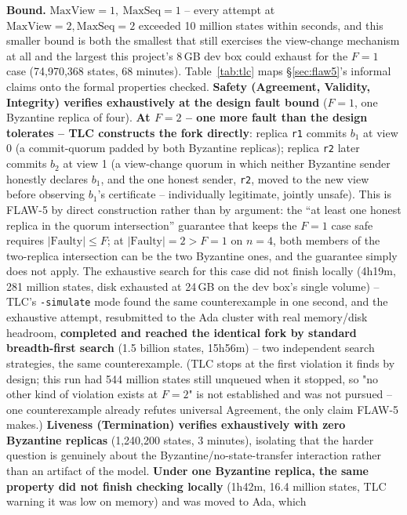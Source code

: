 \documentclass[conference]{IEEEtran}
\begin{document}
\textbf{Bound.} $\text{MaxView}{=}1,\ \text{MaxSeq}{=}1$ -- every attempt at
$\text{MaxView}{=}2,\text{MaxSeq}{=}2$ exceeded 10 million states within seconds, and this smaller
bound is both the smallest that still exercises the view-change mechanism at all and the largest
this project's 8\,GB dev box could exhaust for the $F{=}1$ case (74,970,368 states, 68 minutes).
Table~\ref{tab:tlc} maps \S\ref{sec:flaw5}'s informal claims onto the formal properties checked.
\textbf{Safety (Agreement, Validity, Integrity) verifies exhaustively at the design fault bound}
($F{=}1$, one Byzantine replica of four). \textbf{At $F{=}2$ -- one more fault than the design
tolerates -- TLC constructs the fork directly}: replica \texttt{r1} commits $b_1$ at view 0 (a
commit-quorum padded by both Byzantine replicas); replica \texttt{r2} later commits $b_2$ at view 1
(a view-change quorum in which neither Byzantine sender honestly declares $b_1$, and the one
honest sender, \texttt{r2}, moved to the new view before observing $b_1$'s certificate --
individually legitimate, jointly unsafe). This is FLAW-5 by direct construction rather than by
argument: the ``at least one honest replica in the quorum intersection'' guarantee that keeps the
$F{=}1$ case safe requires $|\text{Faulty}| \le F$; at $|\text{Faulty}|{=}2 > F{=}1$ on $n{=}4$,
both members of the two-replica intersection can be the two Byzantine ones, and the guarantee
simply does not apply. The exhaustive search for this case did not finish locally (4h19m, 281
million states, disk exhausted at 24\,GB on the dev box's single volume) -- TLC's
\texttt{-simulate} mode found the same counterexample in one second, and the exhaustive attempt,
resubmitted to the Ada cluster with real memory/disk headroom, \textbf{completed and reached the
identical fork by standard breadth-first search} (1.5 billion states, 15h56m) -- two independent
search strategies, the same counterexample. (TLC stops at the first violation it finds by design;
this run had 544 million states still unqueued when it stopped, so "no other kind of violation
exists at $F{=}2$" is not established and was not pursued -- one counterexample already refutes
universal Agreement, the only claim FLAW-5 makes.) \textbf{Liveness (Termination) verifies exhaustively with
zero Byzantine replicas} (1,240,200 states, 3 minutes), isolating that the harder question is
genuinely about the Byzantine/no-state-transfer interaction rather than an artifact of the model.
\textbf{Under one Byzantine replica, the same property did not finish checking locally}
(1h42m, 16.4 million states, TLC warning it was low on memory) and was moved to Ada, which
\end{document}
